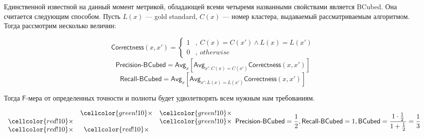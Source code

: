 \documentclass[12pt,fleqn]{article}
\newcommand\xo{\times}
\begin{document}
Единственной известной на данный момент метрикой, обладающей всеми четыремя названными свойствами является BCubed. Она считается следующим способом. Пусть $L(x)$ --- gold standard, $C(x)$ --- номер кластера, выдаваемый рассматриваемым алгоритмом. Тогда рассмотрим несколько величин:

\[
\mathsf{Correctness}(x, x') = 
\begin{cases} 
1 &,\ C(x) = C(x') \wedge L(x) = L(x') \\ 
0 &,\ otherwise
\end{cases}
\]
\[
\mathsf{Precision\mbox{-}BCubed} = \mathsf{Avg}_x \left[\mathsf{Avg}_{x':C(x)=C(x')}\mathsf{Correctness}(x, x')\right]
\]
\[
\mathsf{Recall\mbox{-}BCubed} = \mathsf{Avg}_x \left[\mathsf{Avg}_{x':L(x)=L(x')}\mathsf{Correctness}(x, x')\right]
\]

Тогда $\mathsf F$-мера от определенных точности и полноты будет удволетворять всем нужным нам требованиям.

\begin{vkExample}
\[
\begin{array}{ccc}
     &  \cellcolor{green!10} \xo &  \cellcolor{green!10}\xo \\
    \cellcolor{red!10} \xo  &   &  \cellcolor{green!10} \xo \\
    \cellcolor{red!10} \xo  & \cellcolor{red!10} \xo  & \\
\end{array} \\
\mathsf{Precision\mbox{-}BCubed} = \frac12, \\
\mathsf{Recall\mbox{-}BCubed} = 1, \\
\mathsf{BCubed} = \frac{1 \cdot \frac{1}{2}}{1 + \frac{1}{2}} = \frac{1}{3}
\]
\end{vkExample}
\end{document}
